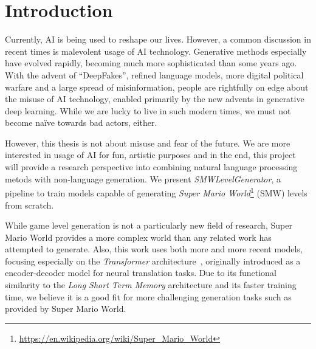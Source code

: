 \section{Introduction}

Currently, AI is being used to reshape our lives. However, a common
discussion in recent times is malevolent usage of AI technology.
Generative methods especially have evolved rapidly, becoming much more
sophisticated than some years ago. With the advent of ``DeepFakes'',
refined language models, more digital political warfare and a large
spread of misinformation, people are rightfully on edge about the
misuse of AI technology, enabled primarily by the new advents in
generative deep learning. While we are lucky to live in such modern
times, we must not become naïve towards bad actors, either.

However, this thesis is not about misuse and fear of the future. We
are more interested in usage of AI for fun, artistic purposes and in
the end, this project will provide a research perspective into
combining natural language processing metods with non-language
generation. We present \emph{SMWLevelGenerator}, a pipeline to train
models capable of generating \emph{Super Mario
World}\footnote{\url{https://en.wikipedia.org/wiki/Super_Mario_World}}
(SMW) levels from scratch.

While game level generation is not a particularly new field of
research, Super Mario World provides a more complex world than any
related work has attempted to generate. Also, this work uses both more
and more recent models, focusing especially on the \emph{Transformer}
architecture~\cite{vaswaniAttentionAllYou2017}, originally introduced
as a encoder-decoder model for neural translation tasks. Due to its
functional similarity to the \emph{Long Short Term Memory}
architecture and its faster training time, we believe it is a good fit
for more challenging generation tasks such as provided by Super Mario
World.



